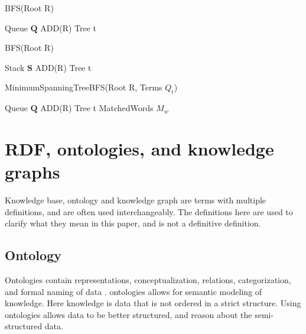 \begin{algorithm}[H]
    \caption{BFS(Root R)}
    \label{BFS}
    \SetAlgoLined
    Queue $\mathbf{Q}$ ADD(R)\; Tree t \;
\end{algorithm}

\begin{algorithm}[H]
    \caption{BFS(Root R)}
    \label{DFS}
    \SetAlgoLined
    Stack $\mathbf{S}$ ADD(R)\; Tree t \;
\end{algorithm}

\begin{algorithm}[H]
    \caption{MinimumSpanningTreeBFS(Root R, Terms $Q_t$)}
    \label{MinTreeBFS}
    \SetAlgoLined
    Queue $\mathbf{Q}$ ADD(R)\; Tree t \; MatchedWords $M_w$ \;
\end{algorithm}


\section{RDF, ontologies, and knowledge graphs}
Knowledge base, ontology and knowledge graph are terms with multiple definitions, and are often used interchangeably. The definitions here are used to clarify what they mean in this paper, and is not a definitive definition.

\subsection{Ontology}
Ontologies contain representations, conceptualization, relations, categorization, and formal naming of data \cite{davies2006semantic}. ontologies allows for semantic modeling of knowledge. Here knowledge is data that is not ordered in a strict structure. Using ontologies allows data to be better structured, and reason about the semi-structured data.

